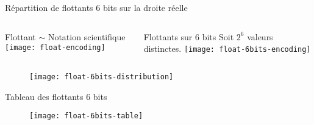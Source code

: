 \documentclass[10pt]{beamer}
\begin{document}





 \questionSlide

 \appendix
 \backupSlides



\begin{frame}{Répartition de flottants 6 bits sur la droite réelle}

\begin{columns}[t]
  \begin{column}{0.48\textwidth}
    \begin{block}{Flottant $\sim$ Notation scientifique}
      \texttt{[image: float-encoding]}
    \end{block}
  \end{column}
  \begin{column}{0.48\textwidth}
    \begin{block}{Flottants sur 6 bits}
      Soit $2^6$ valeurs distinctes.
      \texttt{[image: float-6bits-encoding]}
    \end{block}
  \end{column}
\end{columns}

\begin{figure}[b]
  \centering
  \texttt{[image: float-6bits-distribution]}
\end{figure}

\end{frame}

\begin{frame}{Tableau des flottants 6 bits}
  \begin{figure}[htbp]
    \centering
    \texttt{[image: float-6bits-table]}
  \end{figure}
\end{frame}
\end{document}
